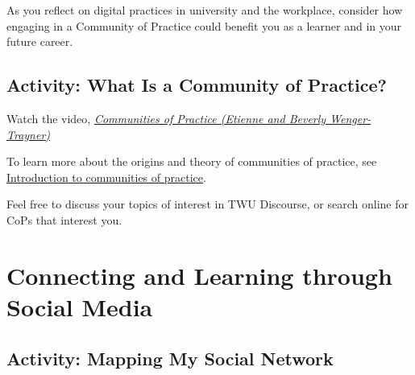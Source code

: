 \documentclass[
]{book}
\theoremstyle{definition}
\theoremstyle{definition}
\theoremstyle{definition}
\theoremstyle{definition}
\theoremstyle{remark}
\begin{document}
As you reflect on digital practices in university and the workplace, consider how engaging in a Community of Practice could benefit you as a learner and in your future career.

\hypertarget{activity-what-is-a-community-of-practice}{%
\subsection*{Activity: What Is a Community of Practice?}\label{activity-what-is-a-community-of-practice}}

\begin{reflect}
Watch the video, \href{https://www.youtube.com/watch?v=SmqLyOLIjos}{\emph{Communities of Practice (Etienne and Beverly Wenger-Trayner)}}

To learn more about the origins and theory of communities of practice, see \href{http://wenger-trayner.com/introduction-to-communities-of-practice}{Introduction to communities of practice}.

Feel free to discuss your topics of interest in TWU Discourse, or search online for CoPs that interest you.
\end{reflect}

\hypertarget{connecting-and-learning-through-social-media}{%
\section{Connecting and Learning through Social Media}\label{connecting-and-learning-through-social-media}}

\hypertarget{activity-mapping-my-social-network}{%
\subsection*{Activity: Mapping My Social Network}\label{activity-mapping-my-social-network}}
\end{document}
